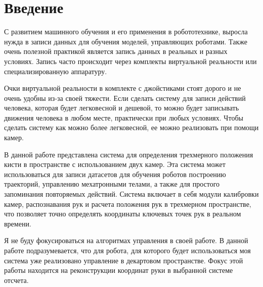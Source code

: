 \documentclass[12pt, a4paper]{article}
\begin{document}
\onehalfspacing



\section{Введение}
С развитием машинного обучения и его применения в робототехнике, выросла
нужда в записи данных для обучения моделей, управляющих роботами. Также
очень полезной практикой является запись данных в реальных и разных
условиях. Запись часто происходит через комплекты виртуальной реальности или
специализированную аппаратуру\cite{umi}. 

Очки виртуальной реальности в комплекте с джойстиками стоят дорого и не очень
удобны из-за своей тяжести. Если сделать систему для записи действий человека,
которая будет легковесной и дешевой, то можно будет записывать движения
человека в любом месте, практически при любых условиях. Чтобы сделать систему
как можно более легковесной, ее можно реализовать при помощи камер. 

В данной работе представлена система для определения трехмерного
положения кисти в пространстве с использованием двух камер. Эта система
может использоваться для записи датасетов для обучения роботов построению
траекторий, управлению мехатронными телами, а также для простого
запоминания повторяемых действий. Система включает в себя модули
калибровки камер, распознавания рук и расчета положения рук в трехмерном
пространстве, что позволяет точно определять координаты ключевых точек рук в
реальном времени. 

Я не буду фокусироваться на алгоритмах управления в своей работе. В данной
работе подразумевается, что для робота, для которого будет использоваться моя
система уже реализовано управление в декартовом пространстве. Фокус этой работы
находится на реконструкции координат руки в выбранной системе отсчета.
\end{document}
